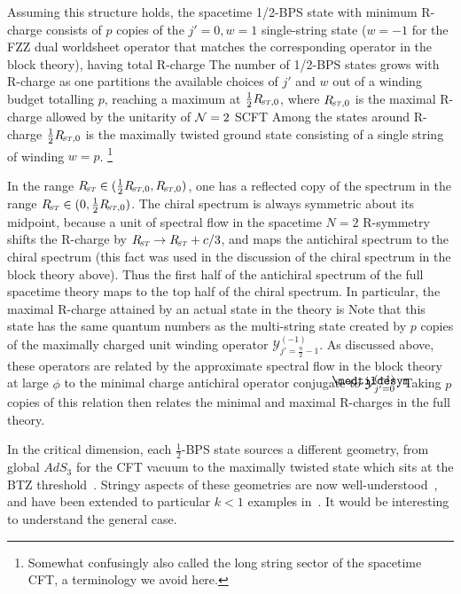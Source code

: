 \documentclass[12pt]{article}
\def\ST{{\sst\it\! ST}}
\newcommand\lowermedtildesym{%
  \text{\smash{\raisebox{-1.2ex}{%
    $\medtildesym$}}}}
\newcommand\medtilde[1]{%
  \mathchoice
    {\accentset{\displaystyle\lowermedtildesym}{#1}}
    {\accentset{\textstyle\lowermedtildesym}{#1}}
    {\accentset{\scriptstyle\lowermedtildesym}{#1}}
    {\accentset{\scriptscriptstyle\lowermedtildesym}{#1}}
}
\def\half{\frac12}
\def\coeff#1#2{{\textstyle \frac{#1}{#2}}}
\def\hf{\coeff12}
\def\NN{{\mathcal{N}}}
\numberwithin{equation}{section}
\def\cY{\mathcal {Y}} \def\cZ{\mathcal {Z}}
\def\sst{\scriptscriptstyle}
\def\coeff#1#2{{\textstyle{\frac{#1}{ #2}}}}
\def\half{\frac12}
\def\hf{{\textstyle\half}}
\def\NN{{\cal N}}
\begin{document}
\begin{appendices}
Assuming this structure holds, the spacetime 1/2-BPS state with minimum R-charge consists of $p$ copies of the $j'=0,w=1$ single-string state ($w=-1$ for the FZZ dual worldsheet operator that matches the corresponding operator in the block theory), having total R-charge 
\eqn[Rmin]{R_{\ST,\rm min}=\frac{p}{n+1}~.
}
The number of 1/2-BPS states grows with R-charge as one partitions the available choices of $j'$ and $w$ out of a winding budget totalling $p$, reaching a maximum at $\hf R_{\ST,0}$, where $R_{\ST,0}$ is the maximal R-charge allowed by the unitarity of $\NN=2$ SCFT
\eqn[Rzero]{
R_{\ST,0} = \frac c3 = \frac{2pn}{n+1}
~.
}
Among the states around R-charge $\hf R_{\ST,0}$ is the maximally twisted ground state consisting of a single string of winding $w=p$.%
\footnote{Somewhat confusingly also called the long string sector of the spacetime CFT, a terminology we avoid here.} 



In the range $R_\ST\in(\hf R_{\ST,0},R_{\ST,0})$, one has a reflected copy of the spectrum in the range $R_\ST\in(0,\hf R_{\ST,0})$.  The chiral spectrum is always symmetric about its midpoint, because a unit of spectral flow in the spacetime $N=2$ R-symmetry shifts the R-charge by $R_\ST\to R_\ST+c/3$, and maps the antichiral spectrum to the chiral spectrum (this fact was used in the discussion of the chiral spectrum in the block theory above).  Thus the first half of the antichiral spectrum of the full spacetime theory maps to the top half of the chiral spectrum.  In particular, the maximal R-charge attained by an actual state in the theory is 
\eqn[Rmax]{
R_{\ST,\rm max} = R_{\ST,0} - \frac{p}{n+1} =\frac{p(2n-1)}{n+1} ~.
}
Note that this state has the same quantum numbers as the multi-string state created by $p$ copies of the maximally charged unit winding operator $\cY^{(-1)}_{j'=\frac n2-1}$. As discussed above, these operators are related by the approximate spectral flow in the block theory at large $\phi$ to the minimal charge antichiral operator conjugate to $\medtilde\cY^{(-1)}_{j'=0}$.  Taking $p$ copies of this relation then relates the minimal and maximal R-charges in the full theory. 

In the critical dimension, each $\hf$-BPS state sources a different geometry, from global $AdS_3$ for the CFT vacuum to the maximally twisted state which sits at the BTZ threshold~. Stringy aspects of these geometries are now well-understood~, and have been extended to particular $k<1$ examples in~.  It would be interesting to understand the general case.








\end{appendices}


\vskip 2cm

\end{document}
